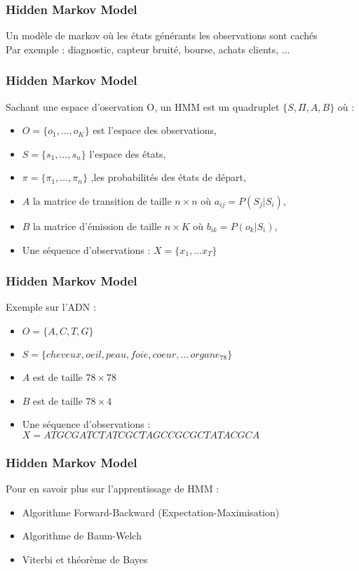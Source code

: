 \begin{frame}
  \frametitle{Hidden Markov Model}
  Un modèle de markov où les états générants les observations sont cachés \\
  Par exemple : diagnostic, capteur bruité, bourse, achats clients, ...
\end{frame}

\begin{frame}
  \frametitle{Hidden Markov Model}
  Sachant une espace d'oservation O, un HMM est un quadruplet $\{S,\Pi,A,B\}$ où :
  \begin{itemize}
  \item $O = \{o_1, \dotsc, o_K \}$ est l'espace des observations,
  \item $S = \{s_1, \dotsc, s_n \}$ l'espace des états,
  \item $\pi = \{\pi_1, \dotsc, \pi_n \}$ ,les probabilités des états de départ,
  \item $A$ la matrice de transition de taille $n\times n$ où $a_{ij} = P(S_j|S_i)$,
  \item $B$ la matrice d'émission de taille $n\times K$ où $b_{ik} = P(o_k|S_i)$,
  \item Une séquence d'observations : $X=\{x_1, \dotsc x_T \}$
  \end{itemize}
\end{frame}

\begin{frame}
  \frametitle{Hidden Markov Model}
  Exemple sur l'ADN : 
  \begin{itemize}
  \item $O = \{A,C,T,G\}$ 
  \item $S =  \{cheveux, oeil, peau, foie, coeur,\dotsc\,organe_{78}\}$
  \item $A$ est de taille $78 \times 78$ 
  \item $B$ est de taille $78\times 4$
  \item Une séquence d'observations : $X=ATGCGATCTATCGCTAGCCGCGCTATACGCA$
  \end{itemize}
\end{frame}

\begin{frame}
  \frametitle{Hidden Markov Model}
  Pour en savoir plus sur l'apprentissage de HMM :
  \begin{itemize}
  \item Algorithme Forward-Backward (Expectation-Maximisation)
  \item Algorithme de Baum-Welch
  \item Viterbi et théorème de Bayes
  \end{itemize}
\end{frame}


